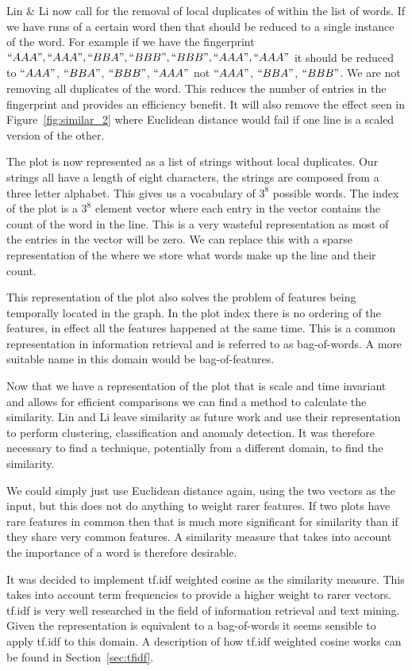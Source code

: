 Lin \& Li now call for the removal of local duplicates of within the list of words.  If we have runs of a certain word then that should be reduced to a single instance of the word.  For example if we have the fingerprint $``AAA",``AAA", ``BBA", ``BBB", ``BBB", ``AAA", ``AAA"$ it should be reduced to $``AAA"$, $``BBA"$, $``BBB"$, $``AAA"$ not $``AAA"$, $``BBA"$, $``BBB"$.  We are not removing all duplicates of the word.  This reduces the number of entries in the fingerprint and provides an efficiency benefit.  It will also remove the effect seen in Figure~\ref{fig:similar_2} where Euclidean distance would fail if one line is a scaled version of the other.

The plot is now represented as a list of strings without local duplicates.  Our strings all have a length of eight characters, the strings are composed from a three letter alphabet.  This gives us a vocabulary of $3^8$ possible words.  The index of the plot is a $3^8$ element vector where each entry in the vector contains the count of the word in the line.  This is a very wasteful representation as most of the entries in the vector will be zero.  We can replace this with a sparse representation of the where we store what words make up the line and their count.

This representation of the plot also solves the problem of features being temporally located in the graph.  In the plot index there is no ordering of the features, in effect all the features happened at the same time.  This is a common representation in information retrieval and is referred to as bag-of-words.  A more suitable name in this domain would be bag-of-features.

Now that we have a representation of the plot that is scale and time invariant and allows for efficient comparisons we can find a method to calculate the similarity.  Lin and Li leave similarity as future work and use their representation to perform clustering, classification and anomaly detection.  It was therefore necessary to find a technique, potentially from a different domain, to find the similarity.

We could simply just use Euclidean distance again, using the two vectors as the input, but this does not do anything to weight rarer features.  If two plots have rare features in common then that is much more significant for similarity than if they share very common features.  A similarity measure that takes into account the importance of a word is therefore desirable.

It was decided to implement tf.idf weighted cosine as the similarity measure.  This takes into account term frequencies to provide a higher weight to rarer vectors.  tf.idf is very well researched in the field of information retrieval and text mining.  Given the representation is equivalent to a bag-of-words it seems sensible to apply tf.idf to this domain.  A description of how tf.idf weighted cosine works can be found in Section~\ref{sec:tfidf}.

